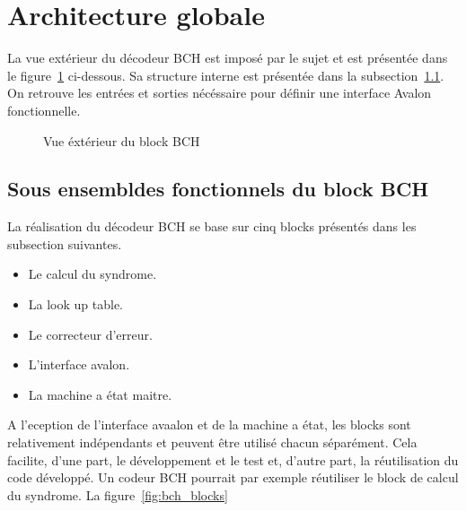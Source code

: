 \documentclass[a4paper, 11pt, svgnames]{report}
\begin{document}
        \section{Architecture globale}
        La vue extérieur du décodeur BCH est imposé par le sujet et est
        présentée dans le figure~\ref{fig:bch} ci-dessous. Sa structure
        interne est présentée dans la subsection~\ref{sec:fonc_bch}. On
        retrouve les entrées et sorties nécéssaire pour définir une
        interface Avalon fonctionnelle.

            \begin{figure}[H]
                \centering
                \caption{Vue éxtérieur du block BCH}
                \label{fig:bch}
            \end{figure}

            \subsection{Sous ensembldes fonctionnels du block BCH}
            \label{sec:fonc_bch}
            La réalisation du décodeur BCH se base sur cinq blocks
            présentés dans les subsection suivantes.
            \begin{itemize}
                \item Le calcul du syndrome.
                \item La look up table.
                \item Le correcteur d'erreur.
                \item L'interface avalon.
                \item La machine a état maitre.
            \end{itemize}
            A l'eception de l'interface avaalon et de la machine a état, les
            blocks sont relativement indépendants et peuvent être utilisé
            chacun séparément. Cela facilite, d'une part, le développement et
            le test et, d'autre part, la réutilisation du code développé. Un
            codeur BCH pourrait par exemple réutiliser le block de calcul du
            syndrome. La figure~\ref{fig:bch_blocks}
\end{document}
